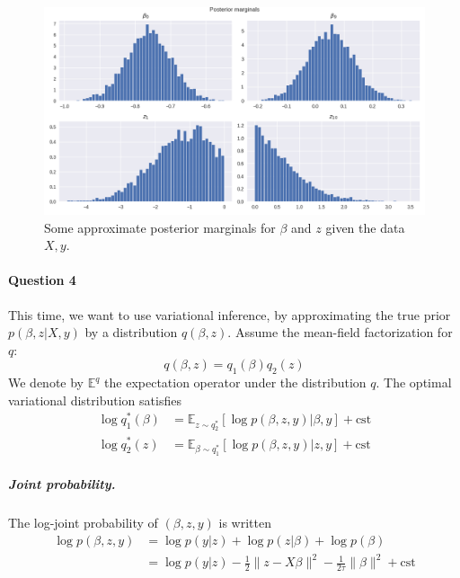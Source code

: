 \documentclass[11pt]{article}
\newcommand\EE{\mathbb{E}}
\begin{document}
\begin{figure}
	\centering
	\includegraphics[width=.96\linewidth]{images/posterior_distribution_gibbs.png}
	\caption{Some approximate posterior marginals for $\beta$ and $z$ given the data $X, y$.}\label{fig:GibbsMarginals}
\end{figure}


\paragraph{Question 4}

This time, we want to use variational inference, by approximating the true prior $p(\beta,z|X,y)$ by a distribution $q(\beta,z)$.
Assume the mean-field factorization for $q$:
\begin{equation}
	q(\beta, z) = q_1(\beta)q_2(z)
\end{equation}
We denote by $\EE^q$ the expectation operator under the distribution $q$. The optimal variational distribution satisfies
\begin{subequations}
\begin{align}
	\log q^*_1(\beta) &= \EE_{z\sim q^*_2}[\log p(\beta,z,y)|\beta,y] + \mathrm{cst}  \\
	\log q^*_2(z) &= \EE_{\beta\sim q^*_1}[\log p(\beta,z,y)|z,y] + \mathrm{cst}
\end{align}
\end{subequations}

\subparagraph{Joint probability.} The log-joint probability of $(\beta,z,y)$ is written
\begin{equation}
\begin{aligned}
	\log p(\beta, z, y)
	&= \log p(y | z) + \log p(z|\beta) + \log p(\beta)  \\
	&= 
	\log p(y|z)
	-\frac{1}{2}\|z-X\beta\|^2 - \frac{1}{2\tau} \|\beta\|^2 + \mathrm{cst}
\end{aligned}
\end{equation}
\end{document}
